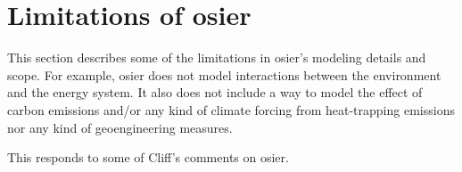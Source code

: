 \section{Limitations of \ac{osier}}

This section describes some of the limitations in \ac{osier}'s modeling details
and scope. For example, \ac{osier} does not model interactions between the
environment and the energy system. It also does not include a way to model the
effect of carbon emissions and/or any kind of climate forcing from heat-trapping
emissions nor any kind of geoengineering measures.

This responds to some of Cliff's comments on \ac{osier}.